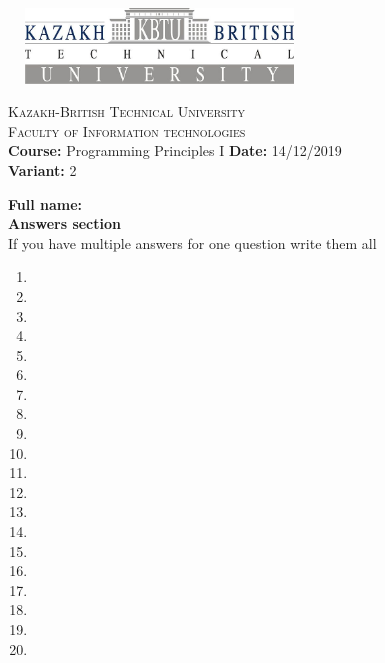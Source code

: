 \documentclass[10pt]{article}
\begin{document}
\begin{center}
\includegraphics[width=8cm, height=2cm]{kbtu.jpg}
\end{center}

\begin{center}
	\begin{minipage}{11.4cm}
		\begin{center}
				{\small \textsc{Kazakh-British Technical University}			\\
						  \textsc{Faculty of Information technologies} \\
                         \textbf{Course:} Programming Principles I \hspace{.65cm}
                         \textbf{Date:} 14/12/2019\\\textbf{Variant:} 2\\
                }
		\end{center}
	\end{minipage}
\end{center}
\textbf{
{Full name:}\\
{Answers section}\\
}
{If you have multiple answers for one question write them all}
\begin{multicols}{5}
\begin{enumerate}
\item \item \item \item \item \item \item \item \item \item \item \item \item \item \item \item \item \item \item \item
\end{enumerate}
\end{multicols}
\end{document}
